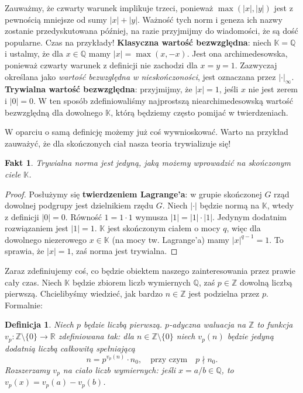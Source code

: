 \documentclass[a4paper,fleqn,9pt]{extarticle}
\newtheorem{fkt}{Fakt}
\newtheorem{dff}{Definicja}
\begin{document}
Zauważmy, że czwarty warunek implikuje trzeci, ponieważ $\max(|x|,|y|)$ jest z pewnością mniejsze od sumy $|x| + |y|$.
Ważność tych norm i geneza ich nazwy zostanie przedyskutowana później, na razie przyjmijmy do wiadomości, że są dość popularne. 
Czas na przykłady!
\textbf{Klasyczna wartość bezwzględna}: niech $\mathbb K = \mathbb Q$ i ustalmy, że dla $x\in\mathbb Q$ mamy $|x| = \max(x,-x)$. Jest ona archimedesowska, ponieważ czwarty warunek z definicji nie zachodzi dla $x = y = 1$.
Zazwyczaj określana jako \emph{wartość bezwzględna w nieskończoności}, jest oznaczana przez $|\cdot|_\infty$.
\textbf{Trywialna wartość bezwzględna}: przyjmijmy, że $|x| = 1$, jeśli $x$ nie jest zerem i $|0| = 0$.
W ten sposób zdefiniowaliśmy najprostszą niearchimedesowską wartość bezwzględną dla dowolnego $\mathbb K$, którą będziemy często pomijać w twierdzeniach.

W oparciu o samą definicję możemy już coś wywnioskować.
Warto na przykład zauważyć, że dla skończonych ciał nasza teoria trywializuje się! 

\begin{fkt}
Trywialna norma jest jedyną, jaką możemy wprowadzić na skończonym ciele $\mathbb K$.
\end{fkt}

\begin{proof}
Posłużymy się \textbf{twierdzeniem Lagrange'a}: w grupie skończonej $G$ rząd dowolnej podgrupy jest dzielnikiem rzędu $G$.
Niech $|\cdot|$ będzie normą na $\mathbb K$, wtedy z definicji $|0| = 0$.
Równość $1 = 1 \cdot 1$ wymusza $|1| = |1| \cdot |1|$.
Jedynym dodatnim rozwiązaniem jest $|1| = 1$.
$\mathbb K$ jest skończonym ciałem o mocy $q$, więc dla dowolnego niezerowego $x\in\mathbb K$ (na mocy tw. Lagrange'a) mamy $|x|^{q-1} = 1$.
To sprawia, że $|x| = 1$, zaś norma jest trywialna.
\end{proof}
 
Zaraz zdefiniujemy coś, co będzie obiektem naszego zainteresowania przez prawie cały czas.
Niech $\mathbb K$ będzie zbiorem liczb wymiernych $\mathbb Q$, zaś $p\in\mathbb Z$ dowolną liczbą pierwszą.
Chcielibyśmy wiedzieć, jak bardzo $n\in\mathbb Z$ jest podzielna przez $p$.
Formalnie:

\begin{dff}
Niech $p$ będzie liczbą pierwszą.
$p$-adyczna waluacja na $\mathbb Z$ to funkcja $v_p:\mathbb Z\setminus\{0\} \rightarrow \mathbb R$ zdefiniowana tak: dla $n\in\mathbb Z\setminus\{0\}$ niech $v_p(n)$ będzie jedyną dodatnią liczbą całkowitą spełniającą
\begin{equation*}
n = p^{v_p(n)} \cdot n_0, \quad \text {przy czym} \quad p\nmid n_0.
\end{equation*}
Rozszerzamy $v_p$ na ciało liczb wymiernych: jeśli $x = a/b \in\mathbb Q$, to $v_p(x) = v_p(a) - v_p(b)$.\end{dff}
\end{document}
